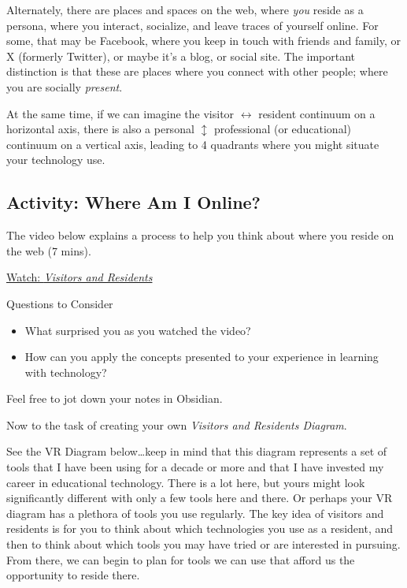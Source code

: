 \documentclass[
]{book}
\providecommand{\tightlist}{%
  \setlength{\itemsep}{0pt}\setlength{\parskip}{0pt}}
\theoremstyle{definition}
\theoremstyle{definition}
\theoremstyle{definition}
\theoremstyle{definition}
\theoremstyle{remark}
\begin{document}
Alternately, there are places and spaces on the web, where \emph{you} reside as a persona, where you interact, socialize, and leave traces of yourself online. For some, that may be Facebook, where you keep in touch with friends and family, or X (formerly Twitter), or maybe it's a blog, or social site. The important distinction is that these are places where you connect with other people; where you are socially \emph{present}.

At the same time, if we can imagine the visitor \(\leftrightarrow\) resident continuum on a horizontal axis, there is also a personal \(\updownarrow\) professional (or educational) continuum on a vertical axis, leading to 4 quadrants where you might situate your technology use.

\hypertarget{activity-where-am-i-online}{%
\subsection*{Activity: Where Am I Online?}\label{activity-where-am-i-online}}

\begin{reflect}
The video below explains a process to help you think about where you reside on the web (7 mins).

\href{https://www.youtube.com/watch?v=sPOG3iThmRI}{Watch: \emph{Visitors and Residents}}

{Questions to Consider}

\begin{itemize}
\tightlist
\item
  What surprised you as you watched the video?
\item
  How can you apply the concepts presented to your experience in learning with technology?
\end{itemize}

Feel free to jot down your notes in Obsidian.
\end{reflect}

Now to the task of creating your own \emph{Visitors and Residents Diagram}.

See the VR Diagram below\ldots keep in mind that this diagram represents a set of tools that I have been using for a decade or more and that I have invested my career in educational technology. There is a lot here, but yours might look significantly different with only a few tools here and there. Or perhaps your VR diagram has a plethora of tools you use regularly. The key idea of visitors and residents is for you to think about which technologies you use as a resident, and then to think about which tools you may have tried or are interested in pursuing. From there, we can begin to plan for tools we can use that afford us the opportunity to reside there.
\end{document}

